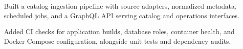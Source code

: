 \begin{bullets}
  \item Built a catalog ingestion pipeline with source adapters, normalized metadata, scheduled jobs, and a GraphQL API serving catalog and operations interfaces.
  \item Added CI checks for application builds, database roles, container health, and Docker Compose configuration, alongside unit tests and dependency audits.
\end{bullets}
